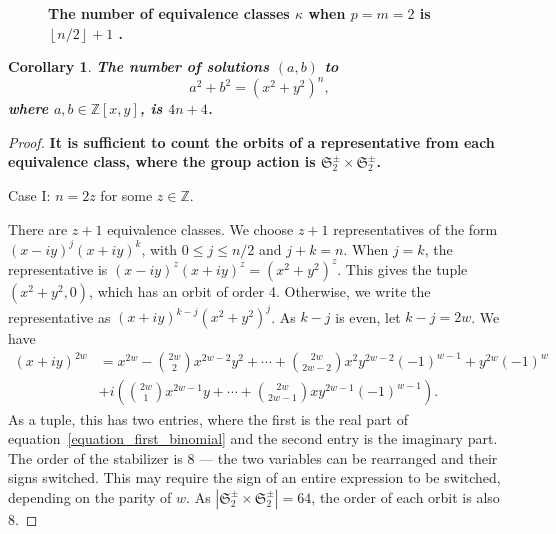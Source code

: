 \documentclass[12pt,table]{article}
\newtheorem{corollary}[theorem]{Corollary}
\numberwithin{equation}{section}
\newcommand{\myfrac}[2]{#1 / #2}
\newcommand{\Zzz}{\mathbb Z}
\begin{document}
\begin{landscape}
{{\begin{figure}[h]
\begin{center}

\end{center}

\caption{
\bf
The number of equivalence classes $ \kappa $
when $p = m = 2$ is $ \left\lfloor \myfrac{n}{2} \right\rfloor + 1 $ .
 }
 
\label{fig:2D}
 
\end{figure}



\begin{corollary}
\bf
The number of solutions $ (a, b) $ to
\[
a^2 + b^2 = (x^2 + y^2)^n,
\]
where $ a, b \in \Zzz[x,y] $, is $4n + 4$.

\end{corollary}
\begin{proof}
\bf
It is sufficient to count the orbits of a representative from each
equivalence class, where the group action is
$ \mathfrak{S}_2^\pm \times \mathfrak{S}_2^\pm $.

\noindent
Case I: $ n = 2z $ for some $ z \in \Zzz $.

There are $ z + 1 $ equivalence classes. We choose $ z + 1 $
representatives of the form $ (x - iy)^j (x + iy)^k $, with
$ 0 \leq j \leq \myfrac{n}{2}$ and $ j + k = n $.
When $ j = k $, the representative
is $ (x - iy)^z (x + iy)^z = ( x^2 + y^2 ) ^ z $.
This gives the tuple $ ( x^2 + y^2, 0 ) $, which has an orbit of order 4.
Otherwise, we write the representative as $ (x + iy)^{k-j} (x^2 + y^2)^j $.
As $ k - j $ is even, let $ k - j = 2w $. We have
\begin{align}
\label{equation_first_binomial}
(x + iy) ^ {2w} &= x ^ {2w} - \binom{2w}{2}  x^{2w - 2 } y^2
+ \dotsb + \binom{2w}{2w-2} x^2 y^{2w - 2} (-1) ^ {w - 1}
+  y^{2w} (-1) ^ {w} \nonumber
\\
&+ i \left( \binom{2w}{1} x ^ {2w - 1} y + \dotsb +
\binom{2w}{2w-1}  x y ^ {2w -1} (-1)^{w-1} \right).
\end{align}
As a tuple, this has two entries, where the first is the real part
of equation~\eqref{equation_first_binomial} and the second entry
is the imaginary part.
The order of the stabilizer is 8 --- the two variables can be rearranged and their
signs switched. This may require the sign of an entire expression to be switched,
depending on the parity of $ w $.
As $ | \mathfrak{S}_2^\pm \times \mathfrak{S}_2^\pm | = 64$, the order of each orbit
is also 8. 


\end{proof}}}
\end{landscape}
\end{document}
